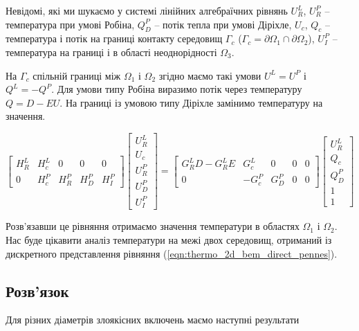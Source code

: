 Невідомі, які ми шукаємо у системі лінійних алгебраїчних рівнянь $U_R^L$, $U_R^P$ -- температура при умові Робіна, 
$Q_D^P$ -- потік тепла при умові Діріхле, $U_c$, $Q_c$ --температура і потік на границі контакту середовищ 
$\Gamma_c$ ($\Gamma_c = \partial \Omega_1 \cap \partial \Omega_2$), $U_I^P$ -- температура на границі і в області 
неоднорідності $\Omega_3$.

На $\Gamma_c$ спільній границі між $\Omega_1$ і $\Omega_2$ згідно \cite{brebbia-bem} маємо такі умови 
$U^L = U^P$ і $Q^L = -Q^P$. Для умови типу Робіна виразимо потік через температуру $Q = D - EU$. На границі із умовою 
типу Діріхле замінимо температуру на значення. 

\begin{equation*}
    \begin{bmatrix}
        H_R^L & H_c^L & 0 & 0 & 0 \\ 
        0 & H_c^P & H_R^P & H_D^P & H_I^P
    \end{bmatrix}
    \begin{bmatrix}
        U_R^L \\ 
        U_c \\
        U_R^P \\ 
        U_D^P \\ 
        U_I^P  
    \end{bmatrix} 
    = 
    \begin{bmatrix}
        G_R^LD-G_R^LE & G_c^L & 0 & 0 & 0\\ 
        0 & -G_c^P & G_D^P & 0 & 0
    \end{bmatrix}
    \begin{bmatrix}
        U_R^L \\
        Q_c \\
        Q_D^P \\
        1 \\
        1  
    \end{bmatrix} 
\end{equation*}

Розв'язавши це рівняння отримаємо значення температури в областях $\Omega_1$ і $\Omega_2$. Нас буде цікавити аналіз 
температури на межі двох середовищ, отриманий із дискретного представлення рівняння 
(\ref{eqn:thermo_2d_bem_direct_pennes}). 

\subsection{Розв'язок}

Для різних діаметрів злоякісних включень маємо наступні результати

